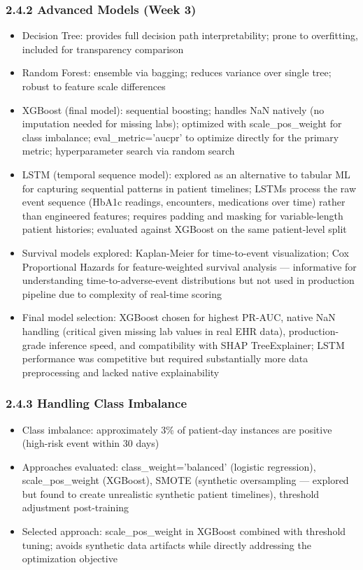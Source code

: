 \documentclass[11pt,a4paper]{article}
\begin{document}
\subsubsection{2.4.2 Advanced Models (Week 3)}
\begin{itemize}
\item Decision Tree: provides full decision path interpretability; prone to overfitting, included for transparency comparison
\item Random Forest: ensemble via bagging; reduces variance over single tree; robust to feature scale differences
\item XGBoost (final model): sequential boosting; handles NaN natively (no imputation needed for missing labs); optimized with scale\_pos\_weight for class imbalance; eval\_metric='aucpr' to optimize directly for the primary metric; hyperparameter search via random search
\item LSTM (temporal sequence model): explored as an alternative to tabular ML for capturing sequential patterns in patient timelines; LSTMs process the raw event sequence (HbA1c readings, encounters, medications over time) rather than engineered features; requires padding and masking for variable-length patient histories; evaluated against XGBoost on the same patient-level split
\item Survival models explored: Kaplan-Meier for time-to-event visualization; Cox Proportional Hazards for feature-weighted survival analysis --- informative for understanding time-to-adverse-event distributions but not used in production pipeline due to complexity of real-time scoring
\item Final model selection: XGBoost chosen for highest PR-AUC, native NaN handling (critical given missing lab values in real EHR data), production-grade inference speed, and compatibility with SHAP TreeExplainer; LSTM performance was competitive but required substantially more data preprocessing and lacked native explainability
\end{itemize}

\subsubsection{2.4.3 Handling Class Imbalance}
\begin{itemize}
\item Class imbalance: approximately 3\% of patient-day instances are positive (high-risk event within 30 days)
\item Approaches evaluated: class\_weight='balanced' (logistic regression), scale\_pos\_weight (XGBoost), SMOTE (synthetic oversampling --- explored but found to create unrealistic synthetic patient timelines), threshold adjustment post-training
\item Selected approach: scale\_pos\_weight in XGBoost combined with threshold tuning; avoids synthetic data artifacts while directly addressing the optimization objective
\end{itemize}
\end{document}
